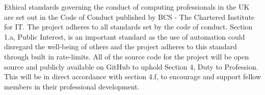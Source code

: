 Ethical standards governing the conduct of computing professionals in the UK are set out in the Code of Conduct published by BCS - The Chartered Institute for IT. The project adheres to all standards set by the code of conduct. Section 1.a, Public Interest, is an important standard as the use of automation could disregard the well-being of others and the project adheres to this standard through built in rate-limits. All of the source code for the project will be open source and publicly available on GitHub to uphold Section 4, Duty to Profession. This will be in direct accordance with section 4.f, to encourage and support fellow members in their professional development.